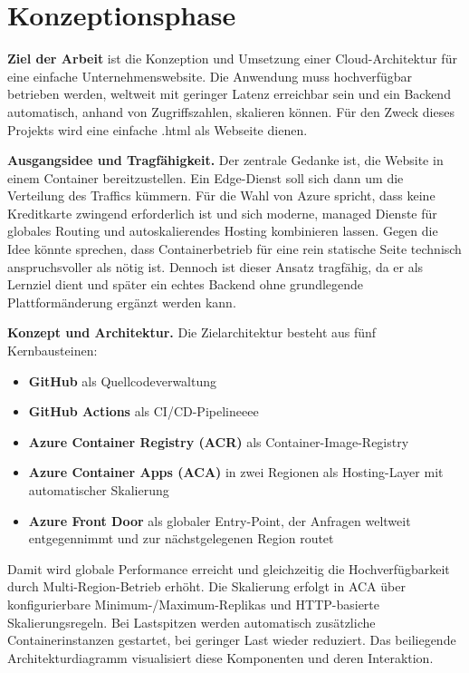 \documentclass[a4paper,11pt]{article}
\begin{document}
\setcounter{page}{1}
\pagestyle{fancy}


\section{Konzeptionsphase}

\textbf{Ziel der Arbeit} ist die Konzeption und Umsetzung einer Cloud-Architektur für eine einfache Unternehmenswebsite.
Die Anwendung muss hochverfügbar betrieben werden, weltweit mit geringer Latenz erreichbar sein und ein Backend automatisch,
anhand von Zugriffszahlen, skalieren können. Für den Zweck dieses Projekts wird eine einfache .html als Webseite dienen.  

\textbf{Ausgangsidee und Tragfähigkeit.} Der zentrale Gedanke ist, die Website in einem Container bereitzustellen.
Ein Edge-Dienst soll sich dann um die Verteilung des Traffics kümmern.
Für die Wahl von Azure spricht, dass keine Kreditkarte zwingend erforderlich ist und sich moderne, managed Dienste für globales Routing und autoskalierendes Hosting kombinieren lassen.
Gegen die Idee könnte sprechen, dass Containerbetrieb für eine rein statische Seite technisch anspruchsvoller als nötig ist.
Dennoch ist dieser Ansatz tragfähig, da er als Lernziel dient und später ein echtes Backend ohne grundlegende Plattformänderung ergänzt werden kann.

\textbf{Konzept und Architektur.} Die Zielarchitektur besteht aus fünf Kernbausteinen:
\begin{itemize}
    \item \textbf{GitHub} als Quellcodeverwaltung
    \item \textbf{GitHub Actions} als CI/CD-Pipelineeee
    \item \textbf{Azure Container Registry (ACR)} als Container-Image-Registry
    \item \textbf{Azure Container Apps (ACA)} in zwei Regionen als Hosting-Layer mit automatischer Skalierung
    \item \textbf{Azure Front Door} als globaler Entry-Point, der Anfragen weltweit entgegennimmt und zur nächstgelegenen Region routet
\end{itemize}
Damit wird globale Performance erreicht und gleichzeitig die Hochverfügbarkeit durch Multi-Region-Betrieb erhöht.
Die Skalierung erfolgt in ACA über konfigurierbare Minimum-/Maximum-Replikas und HTTP-basierte Skalierungsregeln.
Bei Lastspitzen werden automatisch zusätzliche Containerinstanzen gestartet, bei geringer Last wieder reduziert.
Das beiliegende Architekturdiagramm visualisiert diese Komponenten und deren Interaktion.
\end{document}
